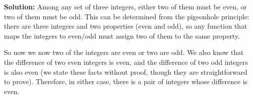 \documentclass[11pt, letterpaper]{report}
\begin{document}
\begin{enumerate}
\textbf{Solution:}  Among any set of three integers, either two of them must be even, or
two of them must be odd.  This can be determined from the pigeonhole principle: there
are three integers and two properties (even and odd), so any function that maps the integers
to even/odd must assign two of them to the same property.  

So now we now two of the integers are even or two are odd.  We also know that the difference
of two even integers is even, and the difference of two odd integers is also even (we state
these facts without proof, though they are straightforward to prove).  Therefore, in 
either case, there is a pair of integers whose difference is even.






\end{enumerate}
\end{document}

